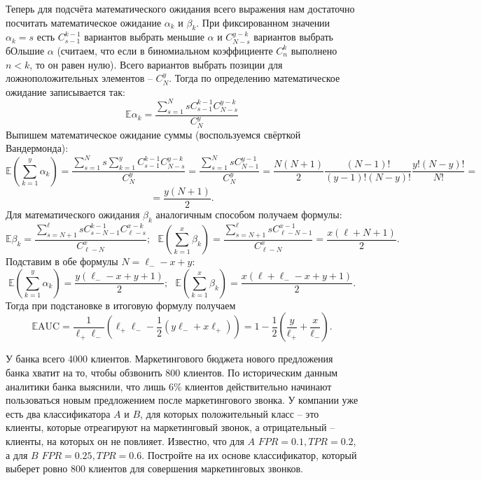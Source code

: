 \documentclass[12pt,a4paper]{article}
\begin{document}
\begin{esSolution}
Теперь для подсчёта математического ожидания всего выражения нам достаточно посчитать математическое ожидание $\alpha_k$ и $\beta_k$.
При фиксированном значении $\alpha_k = s$ есть $C_{s - 1}^{k - 1}$ вариантов выбрать меньшие $\alpha$ и $C_{N - s}^{y - k}$ вариантов выбрать бОльшие $\alpha$ (считаем, что если в биномиальном коэффициенте $C_n^k$ выполнено $n < k$, то он равен нулю).
Всего вариантов выбрать позиции для ложноположительных элементов -- $C_{N}^y.$
Тогда по определению математическое ожидание записывается так:
$$
\mathbb{E}\alpha_k = \frac{\sum\limits_{s = 1}^{N}sC_{s - 1}^{k - 1}C_{N - s}^{y - k}}{C_{N}^y}
$$
Выпишем математическое ожидание суммы (воспользуемся свёрткой Вандермонда):
$$
\mathbb{E}\left(\sum\limits_{k = 1}^y \alpha_k\right) = \frac{\sum\limits_{s = 1}^N s \sum\limits_{k = 1}^y C_{s - 1}^{k - 1}C_{N - s}^{y - k}}{C_{N}^y} = \frac{\sum\limits_{s = 1}^N s C_{N - 1}^{y - 1}}{C_{N}^y} = \frac{N(N + 1)}{2} \frac{(N - 1)!}{(y - 1)! (N - y)!} \frac{y! (N - y)!}{N!} =$$
$$= \frac{y(N + 1)}{2}.
$$
Для математического ожидания $\beta_k$ аналогичным способом получаем формулы:
$$
\mathbb{E}\beta_k = \frac{\sum\limits_{s = N + 1}^{\ell} s C_{s - N - 1}^{k - 1} C_{\ell - s}^{x - k}}{C_{\ell - N}^x};~~~\mathbb{E}\left(\sum\limits_{k = 1}^x \beta_k\right) = \frac{\sum\limits_{s = N + 1}^{\ell}s C_{\ell - N - 1}^{x - 1}}{C_{\ell - N}^x} = \frac{x(\ell + N + 1)}{2}.
$$
Подставим в обе формулы $N = \ell_{-} - x + y:$
$$
\mathbb{E}\left(\sum\limits_{k = 1}^y \alpha_k\right) = \frac{y(\ell_{-} - x + y + 1)}{2};~~~\mathbb{E}\left(\sum\limits_{k = 1}^x \beta_k\right) = \frac{x(\ell + \ell_{-} - x + y + 1)}{2}.
$$
Тогда при подстановке в итоговую формулу получаем
$$
\mathbb{E}\text{AUC} = \frac{1}{\ell_{+}\ell_{-}}\left(\ell_{+}\ell_{-} - \frac{1}{2}\left(y\ell_{-} + x\ell_{+}\right) \right) = 1 - \frac{1}{2}\left(\frac{y}{\ell_{+}} + \frac{x}{\ell_{-}}\right).
$$
\end{esSolution}

\begin{vkProblem} \label{task:economics}
У банка всего 4000 клиентов.
Маркетингового бюджета нового предложения банка хватит на то, чтобы обзвонить 800 клиентов.
По историческим данным аналитики банка выяснили, что лишь 6\% клиентов действительно начинают пользоваться новым предложением после маркетингового звонка.
У компании уже есть два классификатора $A$ и $B$, для которых положительный класс -- это клиенты, которые отреагируют на маркетинговый звонок, а отрицательный -- клиенты, на которых он не повлияет.
Известно, что для $A$ $FPR = 0.1, TPR = 0.2$, а для $B$ $FPR = 0.25, TPR = 0.6.$
Постройте на их основе классификатор, который выберет ровно 800 клиентов для совершения маркетинговых звонков.
\end{vkProblem}
\end{document}
